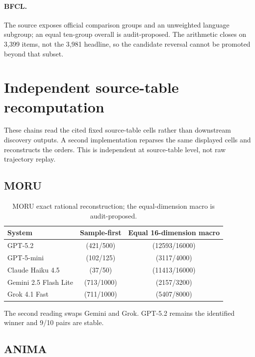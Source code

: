 \paragraph{BFCL.}
The source exposes official comparison groups and an unweighted language subgroup; an equal ten-group overall is audit-proposed.  The arithmetic closes on 3,399 items, not the 3,981 headline, so the candidate reversal cannot be promoted beyond that subset.

\section{Independent source-table recomputation}
\label{app:independent-recomputation}

These chains read the cited fixed source-table cells rather than downstream discovery outputs.  A second implementation reparses the same displayed cells and reconstructs the orders.  This is independent at source-table level, not raw trajectory replay.

\subsection{MORU}

\begin{table}[ht]
\centering
\caption{MORU exact rational reconstruction; the equal-dimension macro is audit-proposed.}
\label{tab:reviewer-moru-recomputation}
\begin{tabular}{lcc}
\toprule System & Sample-first & Equal 16-dimension macro \\
\midrule
GPT-5.2 & (421/500) & (12593/16000) \\
GPT-5-mini & (102/125) & (3117/4000) \\
Claude Haiku 4.5 & (37/50) & (11413/16000) \\
Gemini 2.5 Flash Lite & (713/1000) & (2157/3200) \\
Grok 4.1 Fast & (711/1000) & (5407/8000) \\
\bottomrule
\end{tabular}
\end{table}

The second reading swaps Gemini and Grok.  GPT-5.2 remains the identified winner and 9/10 pairs are stable.

\subsection{ANIMA}

